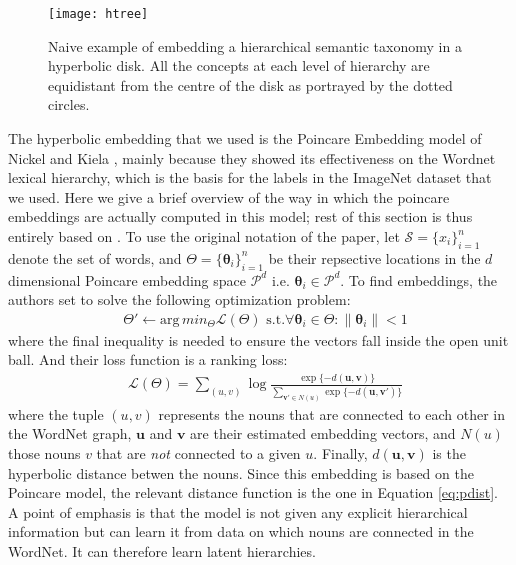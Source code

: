 \documentclass[12pt]{report}
\begin{document}
\begin{figure}
  \centering
  \texttt{[image: htree]}
	\caption{Naive example of embedding a hierarchical semantic taxonomy in a hyperbolic disk. All the concepts at each level of hierarchy are equidistant from the centre of the disk as portrayed by the dotted circles.}
  \label{fig:htree}
\end{figure}

The hyperbolic embedding that we used is the Poincare Embedding model of Nickel and Kiela \cite{Nickel2017}, mainly because they showed its effectiveness on the Wordnet lexical hierarchy, which is the basis for the labels in the ImageNet dataset that we used. Here we give a brief overview of the way in which the poincare embeddings are actually computed in this model; rest of this section is thus entirely based on \cite{Nickel2017}.  To use the original notation of the paper, let $\mathcal{S} = \{x_i\}_{i=1}^n$ denote the set of words, and $\Theta = \{\boldsymbol{\theta}_i\}_{i=1}^n$ be their repsective locations in the $d$ dimensional Poincare embedding space $\mathcal{P}^d$ i.e. $\boldsymbol{\theta}_i \in \mathcal{P}^d$. To find embeddings, the authors set to solve the following optimization problem:
\begin{align*}
  &\Theta' \leftarrow \text{arg}\,min_{\Theta} \mathcal{L}\left(\Theta\right)\text{  s.t.} \forall \boldsymbol{\theta}_i \in \Theta : \lVert \boldsymbol{\theta}_i \rVert < 1
\end{align*}
where the final inequality is needed to ensure the vectors fall inside the open unit ball. And their loss function is a ranking loss:
\begin{align*}
  &\mathcal{L} \left(\Theta\right) = \sum_{(u,v)} \log \frac{\exp\{-d( \mathbf{u},\mathbf{v})\}}{\sum_{\mathbf{v'}\in N(u)}\exp\{-d(\mathbf{u},\mathbf{v'})\}}
\end{align*}
where the tuple $(u,v)$ represents the nouns that are connected to each other in the WordNet graph, $\mathbf{u}$ and $\mathbf{v}$ are their estimated embedding vectors, and $N(u)$ those nouns $v$ that are \textit{not} connected to a given $u$. Finally, $d(\mathbf{u}, \mathbf{v})$ is the hyperbolic distance betwen the nouns. Since this embedding is based on the Poincare model, the relevant distance function is the one in Equation \ref{eq:pdist}. A point of emphasis is that the model is not given any explicit hierarchical information but can learn it from data on which nouns are connected in the WordNet. It can therefore learn latent hierarchies. 
\end{document}
